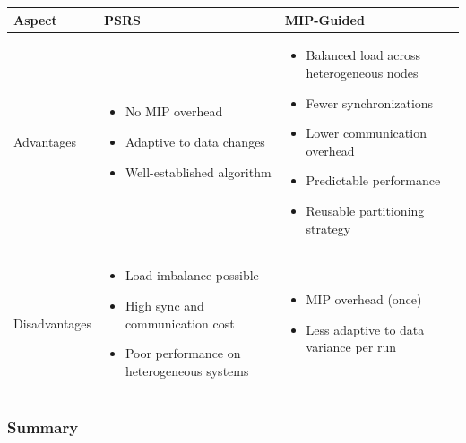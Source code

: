 \documentclass[]{interact}
\theoremstyle{plain}
\theoremstyle{definition}
\theoremstyle{remark}
\begin{document}
\begin{table}[H]
\begin{tabular}{|p{3cm}|p{5cm}|p{5cm}|}
\hline
\textbf{Aspect} & \textbf{PSRS} & \textbf{MIP-Guided} \\
\hline
Advantages &
\begin{itemize}
    \item No MIP overhead
    \item Adaptive to data changes
    \item Well-established algorithm
\end{itemize}
&
\begin{itemize}
    \item Balanced load across heterogeneous nodes
    \item Fewer synchronizations
    \item Lower communication overhead
    \item Predictable performance
    \item Reusable partitioning strategy
\end{itemize} \\
\hline
Disadvantages &
\begin{itemize}
    \item Load imbalance possible
    \item High sync and communication cost
    \item Poor performance on heterogeneous systems
\end{itemize}
&
\begin{itemize}
    \item MIP overhead (once)
    \item Less adaptive to data variance per run
\end{itemize} \\
\hline
\end{tabular}
\end{table}


\subsubsection{Summary}
\end{document}
